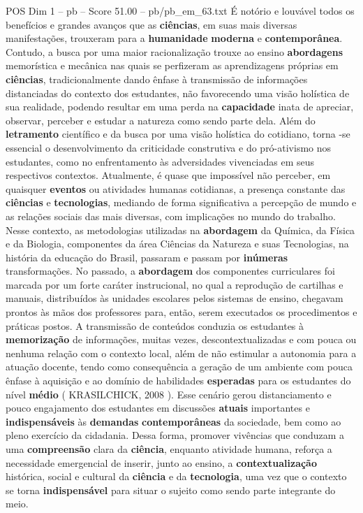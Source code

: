 \begin{textsample}{POS Dim 1 – pb – Score 51.00 – pb/pb\_em\_63.txt}
É notório e louvável todos os benefícios e grandes avanços que as \textbf{ciências}, em suas mais diversas manifestações, trouxeram para a \textbf{humanidade} \textbf{moderna} e \textbf{contemporânea}.
Contudo, a busca por uma maior racionalização trouxe ao ensino \textbf{abordagens} memorística e mecânica nas quais se perfizeram as aprendizagens próprias em \textbf{ciências}, tradicionalmente dando ênfase à transmissão de informações distanciadas do contexto dos estudantes, não favorecendo uma visão holística de sua realidade, podendo resultar em uma perda na \textbf{capacidade} inata de apreciar, observar, perceber e estudar a natureza como sendo parte dela.
Além do \textbf{letramento} científico e da busca por uma visão holística do cotidiano, torna -se essencial o desenvolvimento da criticidade construtiva e do pró-ativismo nos estudantes, como no enfrentamento às adversidades vivenciadas em seus respectivos contextos.
Atualmente, é quase que impossível não perceber, em quaisquer \textbf{eventos} ou atividades humanas cotidianas, a presença constante das \textbf{ciências} e \textbf{tecnologias}, mediando de forma significativa a percepção de mundo e as relações sociais das mais diversas, com implicações no mundo do trabalho.
Nesse contexto, as metodologias utilizadas na \textbf{abordagem} da Química, da Física e da Biologia, componentes da área Ciências da Natureza e suas Tecnologias, na história da educação do Brasil, passaram e passam por \textbf{inúmeras} transformações.
No passado, a \textbf{abordagem} dos componentes curriculares foi marcada por um forte caráter instrucional, no qual a reprodução de cartilhas e manuais, distribuídos às unidades escolares pelos sistemas de ensino, chegavam prontos às mãos dos professores para, então, serem executados os procedimentos e práticas postos.
A transmissão de conteúdos conduzia os estudantes à \textbf{memorização} de informações, muitas vezes, descontextualizadas e com pouca ou nenhuma relação com o contexto local, além de não estimular a autonomia para a atuação docente, tendo como consequência a geração de um ambiente com pouca ênfase à aquisição e ao domínio de habilidades \textbf{esperadas} para os estudantes do nível \textbf{médio} ( KRASILCHICK, 2008 ).
Esse cenário gerou distanciamento e pouco engajamento dos estudantes em discussões \textbf{atuais} importantes e \textbf{indispensáveis} às \textbf{demandas} \textbf{contemporâneas} da sociedade, bem como ao pleno exercício da cidadania.
Dessa forma, promover vivências que conduzam a uma \textbf{compreensão} clara da \textbf{ciência}, enquanto atividade humana, reforça a necessidade emergencial de inserir, junto ao ensino, a \textbf{contextualização} histórica, social e cultural da \textbf{ciência} e da \textbf{tecnologia}, uma vez que o contexto se torna \textbf{indispensável} para situar o sujeito como sendo parte integrante do meio.

\end{textsample}
